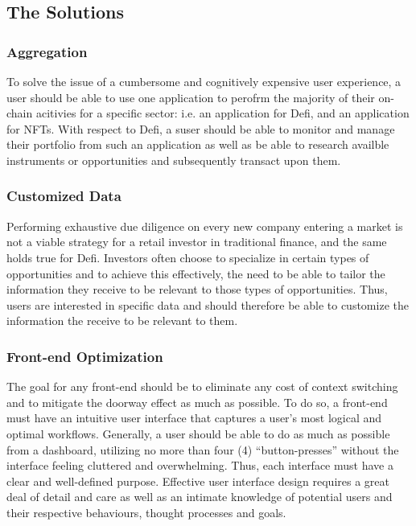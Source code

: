 \documentclass[10pt]{article}
\begin{document}
					\subsection{The Solutions}
					\subsubsection{Aggregation}
					To solve the issue of a cumbersome and cognitively expensive user experience,
					a user should be able to use one application to perofrm the majority of their
					on-chain acitivies for a specific sector: i.e. an application for Defi, and an
					application for NFTs. With respect to Defi, a suser should be able to monitor
					and manage their portfolio from such an application as well as be able to
					research availble instruments or opportunities and subsequently transact upon
					them.
					\subsubsection{Customized Data}
					Performing exhaustive due diligence on every new company entering a market is
					not a viable strategy for a retail investor in traditional finance, and the same
					holds true for Defi. Investors often choose to specialize in certain types of
					opportunities and to achieve this effectively, the need to be able to tailor the
					information they receive to be relevant to those types of opportunities. Thus,
					users are interested in specific data and should therefore be able to customize
					the information the receive to be relevant to them.
					\subsubsection{Front-end Optimization}
					The goal for any front-end should be to eliminate any cost of context switching
					and to mitigate the doorway effect as much as possible. To do so, a front-end
					must have an intuitive user interface that captures a user's most logical and
					optimal workflows. Generally, a user should be able to do as much as possible
					from a dashboard, utilizing no more than four (4) ``button-presses'' without the
					interface feeling cluttered and overwhelming. Thus, each interface must have
					a clear and well-defined purpose. Effective user interface design requires
					a great deal of detail and care as well  as an intimate knowledge of potential
					users and their respective behaviours, thought processes and goals.
\end{document}
